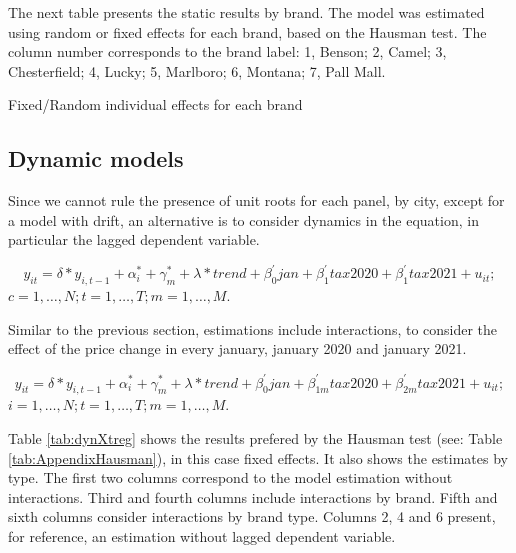 \documentclass[]{article}
\begin{document}
The next table presents the static results by brand. The model was estimated using random or fixed effects for each brand, based on the Hausman test. The column number corresponds to the brand label: 1, Benson; 2, Camel; 3, Chesterfield; 4, Lucky; 5, Marlboro; 6, Montana; 7, Pall Mall.

\begin{landscape}
	\begin{table}[ht]
		\centering
		\caption{Fixed/Random individual effects for each brand \label{tab:staticXtregMarcas}} 
	
	\end{table}
\end{landscape}
 
\subsection{Dynamic models}
Since we cannot rule the presence of unit roots for each panel, by city, except for a model with drift, an alternative is to consider dynamics in the equation, in particular the lagged dependent variable. 

\begin{equation*} 
	y_{it}  = \delta*y_{i,t-1} + \alpha_{i}^{*} + \gamma_{m}^{*} + \lambda*trend + \beta_{0}^{'}jan + \beta_{1}^{'}tax2020 + \beta_{1}^{'}tax2021 + u_{it}
	;   \tag{4.3}
\end{equation*}
$c  = 1,\ldots,N;  t=1,\ldots,T; m=1,\ldots,M. $

Similar to the previous section, estimations include interactions, to consider the effect of the price change in every january, january 2020 and january 2021.

\begin{equation*} 
	y_{it}  = \delta*y_{i,t-1} +\alpha_{i}^{*} + \gamma_{m}^{*} + \lambda*trend + \beta_{0}^{'}jan + \beta_{1m}^{'}tax2020 + \beta_{2m}^{'}tax2021 + u_{it}
	;   \tag{4.4}
\end{equation*}
$i  = 1,\ldots,N;  t=1,\ldots,T; m=1,\ldots,M. $



Table \ref{tab:dynXtreg} shows the results prefered by the Hausman test (see: Table \ref{tab:AppendixHausman}), in this case fixed effects. It  also shows the estimates by type. The first two columns correspond to the model estimation without interactions. Third and fourth columns include interactions by brand. Fifth and sixth columns consider interactions by brand type.
Columns 2, 4 and 6 present, for reference, an estimation without lagged dependent variable. 
\end{document}
